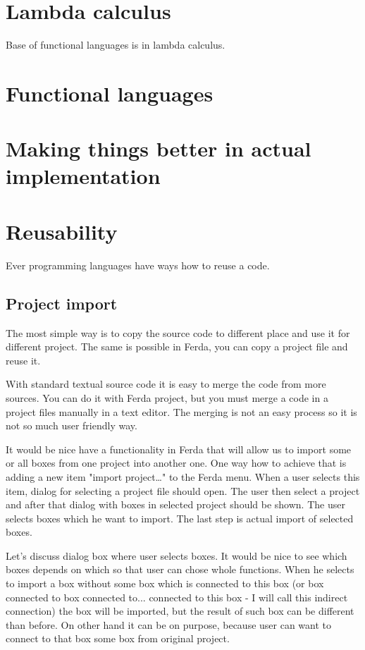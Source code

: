 \documentclass[a4paper,12pt]{book}
\begin{document}
\section{Lambda calculus}
Base of functional languages is in lambda calculus. 

\section{Functional languages}

\section{Making things better in actual implementation}
\section{Reusability}
Ever programming languages have ways how to reuse a code. 

\subsection{Project import}
The most simple way is to copy the source code to different place and use it for different project. The same is possible in Ferda, you can copy a project file and reuse it.

With standard textual source code it is easy to merge the code from more sources. You can do it with Ferda project, but you must merge a code in a project files manually in a text editor. The merging is not an easy process so it is not so much user friendly way.

It would be nice have a functionality in Ferda that will allow us to import some or all boxes from one project into another one. One way how to achieve that is adding a new item "import project\dots" to the Ferda menu. When a user selects this item, dialog for selecting a project file should open. The user then select a project and after that dialog with boxes in selected project should be shown. The user selects boxes which he want to import. The last step is actual import of selected boxes.

Let's discuss dialog box where user selects boxes. It would be nice to see which boxes depends on which so that user can chose whole functions. When he selects to import a box without some box which is connected to this box (or box connected to box connected to... connected to this box - I will call this indirect connection) the box will be imported, but the result of such box can be different than before. On other hand it can be on purpose, because user can want to connect to that box some box from original project.
\end{document}
